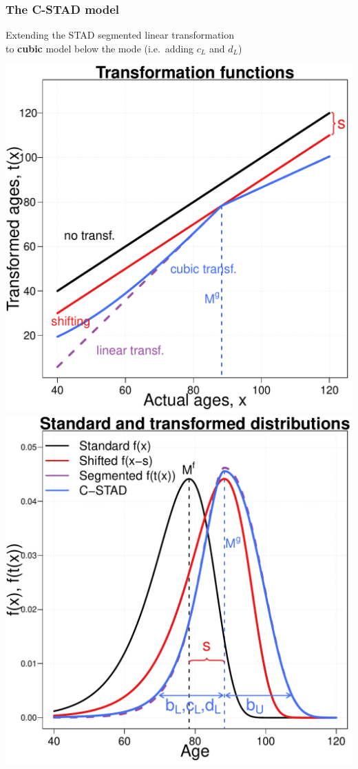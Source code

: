 \documentclass[12pt, xcolor=table]{beamer}  %
\begin{document}
\begin{frame}[noframenumbering]\frametitle{The C-STAD model}
	
	\begin{center}	
		Extending the STAD segmented linear transformation \\ to \textbf{cubic} model below the mode (i.e.~adding {\color{Blue}$c_L$} and {\color{Blue}$d_L$}) 
		
		\vspace{0.25cm}
		
		\includegraphics[scale=.32]{Figures/Ch4/F2_Model_CSTAD.pdf}\includegraphics[scale=.32]{Figures/Ch4/F2_Dens_CSTAD.pdf}
		
		
	\end{center}
	
\end{frame}
\end{document}
